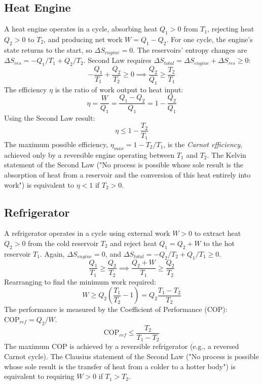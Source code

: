 \documentclass[10pt, letterpaper]{article}
\begin{document}
\subsection{Heat Engine}
A heat engine operates in a cycle, absorbing heat $Q_1 > 0$ from $T_1$, rejecting heat $Q_2 > 0$ to $T_2$, and producing net work $W = Q_1 - Q_2$.
For one cycle, the engine's state returns to the start, so $\Delta S_{engine} = 0$.
The reservoirs' entropy changes are $\Delta S_{res} = -Q_1/T_1 + Q_2/T_2$.
Second Law requires $\Delta S_{total} = \Delta S_{engine} + \Delta S_{res} \ge 0$:
\begin{equation*}
    -\frac{Q_1}{T_1} + \frac{Q_2}{T_2} \ge 0 \implies \frac{Q_2}{Q_1} \ge \frac{T_2}{T_1}
\end{equation*}
The efficiency $\eta$ is the ratio of work output to heat input:
\begin{equation*}
    \eta = \frac{W}{Q_1} = \frac{Q_1 - Q_2}{Q_1} = 1 - \frac{Q_2}{Q_1}
\end{equation*}
Using the Second Law result:
\begin{equation}
    \eta \le 1 - \frac{T_2}{T_1}
\end{equation}
The maximum possible efficiency, $\eta_{max} = 1 - T_2/T_1$, is the \textit{Carnot efficiency}, achieved only by a reversible engine operating between $T_1$ and $T_2$. The Kelvin statement of the Second Law ("No process is possible whose sole result is the absorption of heat from a reservoir and the conversion of this heat entirely into work") is equivalent to $\eta < 1$ if $T_2 > 0$.

\subsection{Refrigerator}
A refrigerator operates in a cycle using external work $W > 0$ to extract heat $Q_2 > 0$ from the cold reservoir $T_2$ and reject heat $Q_1 = Q_2 + W$ to the hot reservoir $T_1$.
Again, $\Delta S_{engine} = 0$, and $\Delta S_{total} = -Q_2/T_2 + Q_1/T_1 \ge 0$.
\begin{equation*}
    \frac{Q_1}{T_1} \ge \frac{Q_2}{T_2} \implies \frac{Q_2 + W}{T_1} \ge \frac{Q_2}{T_2}
\end{equation*}
Rearranging to find the minimum work required:
\begin{equation*}
    W \ge Q_2 \left( \frac{T_1}{T_2} - 1 \right) = Q_2 \frac{T_1 - T_2}{T_2}
\end{equation*}
The performance is measured by the Coefficient of Performance (COP): $\mathrm{COP}_{ref} = Q_2 / W$.
\begin{equation}
    \mathrm{COP}_{ref} \le \frac{T_2}{T_1 - T_2}
\end{equation}
The maximum COP is achieved by a reversible refrigerator (e.g., a reversed Carnot cycle). The Clausius statement of the Second Law ("No process is possible whose sole result is the transfer of heat from a colder to a hotter body") is equivalent to requiring $W > 0$ if $T_1 > T_2$.
\end{document}
